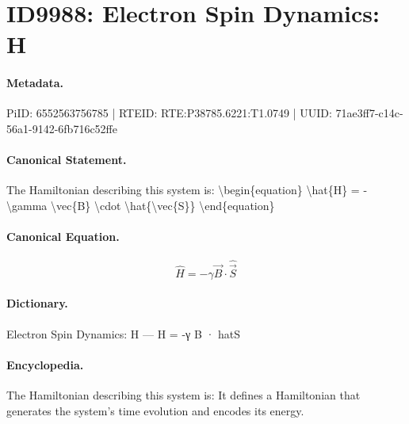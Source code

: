 \section*{ID9988: Electron Spin Dynamics: H}
\paragraph{Metadata.}
PiID: 6552563756785 | RTEID: RTE:P38785.6221:T1.0749 | UUID: 71ae3ff7-c14c-56a1-9142-6fb716c52ffe

\paragraph{Canonical Statement.}
The Hamiltonian describing this system is: \textbackslash{}begin\{equation\} \textbackslash{}hat\{H\} = -\textbackslash{}gamma \textbackslash{}vec\{B\} \textbackslash{}cdot \textbackslash{}hat\{\textbackslash{}vec\{S\}\} \textbackslash{}end\{equation\}

\paragraph{Canonical Equation.}
\[
\hat{H} = -\gamma \vec{B} \cdot \hat{\vec{S}}
\]

\paragraph{Dictionary.}
Electron Spin Dynamics: H — H = -γ B · hatS

\paragraph{Encyclopedia.}
The Hamiltonian describing this system is: It defines a Hamiltonian that generates the system's time evolution and encodes its energy.
